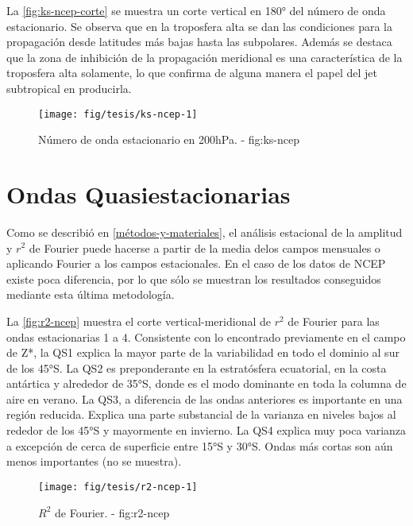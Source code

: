 \documentclass[spanish,a4paper,12p]{book}
\begin{document}
La \autoref{fig:ks-ncep-corte} se muestra un corte vertical en 180° del
número de onda estacionario. Se observa que en la troposfera alta se dan
las condiciones para la propagación desde latitudes más bajas hasta las
subpolares. Además se destaca que la zona de inhibición de la
propagación meridional es una característica de la troposfera alta
solamente, lo que confirma de alguna manera el papel del jet subtropical
en producirla.

\begin{landscape}\begin{figure}

{\centering \texttt{[image: fig/tesis/ks-ncep-1]} 

}

\caption{Número de onda estacionario en 200hPa. - fig:ks-ncep}\label{fig:ks-ncep}
\end{figure}
\end{landscape}

\section{Ondas Quasiestacionarias}\label{ondas-quasiestacionarias}

Como se describió en \autoref{métodos-y-materiales}, el análisis
estacional de la amplitud y \(r^2\) de Fourier puede hacerse a partir de
la media delos campos mensuales o aplicando Fourier a los campos
estacionales. En el caso de los datos de NCEP existe poca diferencia,
por lo que sólo se muestran los resultados conseguidos mediante esta
última metodología.

La \autoref{fig:r2-ncep} muestra el corte vertical-meridional de \(r^2\)
de Fourier para las ondas estacionarias 1 a 4. Consistente con lo
encontrado previamente en el campo de Z*, la QS1 explica la mayor parte
de la variabilidad en todo el dominio al sur de los 45°S. La QS2 es
preponderante en la estratósfera ecuatorial, en la costa antártica y
alrededor de 35°S, donde es el modo dominante en toda la columna de aire
en verano. La QS3, a diferencia de las ondas anteriores es importante en
una región reducida. Explica una parte substancial de la varianza en
niveles bajos al rededor de los 45°S y mayormente en invierno. La QS4
explica muy poca varianza a excepción de cerca de superficie entre 15°S
y 30°S. Ondas más cortas son aún menos importantes (no se muestra).

\begin{landscape}\begin{figure}

{\centering \texttt{[image: fig/tesis/r2-ncep-1]} 

}

\caption{$R^2$ de Fourier. - fig:r2-ncep}\label{fig:r2-ncep}
\end{figure}
\end{landscape}
\end{document}
